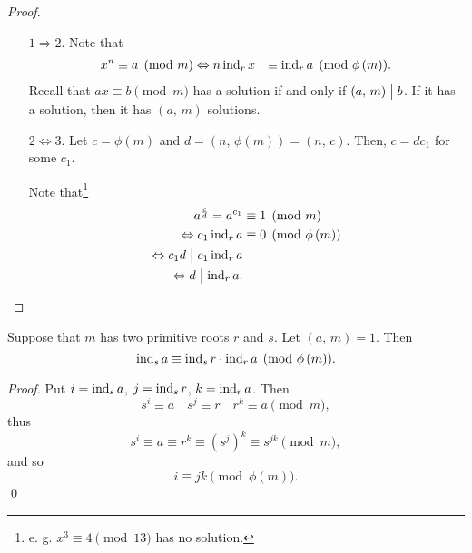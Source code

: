 \begin{proof}
    \begin{enumerate}
        \item[$1 \Rightarrow 2$.] Note that
        \begin{align*}
            x^n &\equiv a \pmod{m}
            \Leftrightarrow n \operatorname{\mathrm{ind}}_r x &\equiv \operatorname{\mathrm{ind}}_r a \pmod{\phi\left(m\right)}.
        \end{align*} 
        Recall that $ax \equiv b \pmod{m}$ has a solution if and only if $\left(a,\,m\right)\bigm| b$.
        If it has a solution, then it has $\left(a,\,m\right)$ solutions.
        \item[$2 \Leftrightarrow 3$.] Let $c = \phi\left(m\right)$ and $d=\left(n,\,\phi\left(m\right)\right)=\left(n,\,c\right)$.
        Then, $c = dc_1$ for some $c_1$.
        
        Note that\footnote{
            e. g. $x^3 \equiv 4 \pmod{13}$ has no solution.
        }
        \begin{align*}
            a^{\frac{c}{d}} = a^{c_1} &\equiv 1 \pmod{m} \\
            \Leftrightarrow c_1 \operatorname{\mathrm{ind}}_r a &\equiv 0 \pmod{\phi\left(m\right)} \\
            \Leftrightarrow c_1d \bigm| c_1 \operatorname{\mathrm{ind}}_r a \\
            \Leftrightarrow d \bigm| \operatorname{\mathrm{ind}}_r a.
        \end{align*}
    \end{enumerate}
\end{proof}

\begin{note}
    Suppose that $m$ has two primitive roots $r$ and $s$. Let $\left(a,\,m\right)=1$.
    Then
     \[
        \operatorname{\mathrm{ind}}_s a \equiv \operatorname{\mathrm{ind}}_s r \cdot \operatorname{\mathrm{ind}}_r a \pmod{\phi\left(m\right)}.
    \]
\end{note}

\begin{proof}
    Put $i=\operatorname{\mathrm{ind}}_s a$, $j=\operatorname{\mathrm{ind}}_s r$, $k=\operatorname{\mathrm{ind}}_r a$. Then
    \[
        s^i \equiv a \quad s^j \equiv r \quad r^k \equiv a \pmod{m},
    \]
    thus
    \[
        s^i \equiv a \equiv r^k \equiv \left(s^j\right)^k \equiv s^{jk} \pmod{m},
    \]
    and so
    \[
        i \equiv jk \pmod{\phi\left(m\right)}.
    \]\qed
\end{proof}